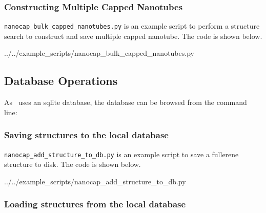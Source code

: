 \subsubsection{Constructing Multiple Capped Nanotubes }

\verb|nanocap_bulk_capped_nanotubes.py| is an example script to perform a structure search to construct and save multiple capped nanotube. The code is shown below.

%
			{../../example_scripts/nanocap_bulk_capped_nanotubes.py}
			
\subsection{Database Operations}

As \nanocap~uses an sqlite database, the database can be browsed from the command line:


\subsubsection{Saving structures to the local database }

\verb|nanocap_add_structure_to_db.py| is an example script to save a fullerene structure to disk. The code is shown below.

%
			{../../example_scripts/nanocap_add_structure_to_db.py}

\subsubsection{Loading structures from the local database }

